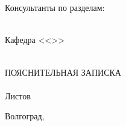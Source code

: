 {    \hfill
    \\\\
    Консультанты по разделам:\\
    \hfill
    \hfill
    \\
    \clearpage
    \renewcommand{\VSTUDocumentCodeSuffix}{81}
    \thispagestyle{empty}
    \begin{center}
    \VSTUTitleHeading
    Кафедра <<\VSTUDepartment>>\\
    \end{center}
    \vfill
    \hfill\VSTUTitleHeadApproval
    \vspace{8mm}
    \begin{center}
    \VSTUTitle\\
    \vspace{\fill}
    ПОЯСНИТЕЛЬНАЯ ЗАПИСКА\\
    \vspace{8mm}
    \VSTUDocumentCode\\
    \vspace{8mm}
    Листов \totalpages\\
    \vspace{\fill}
    \end{center}
    \begin{flushright}
    \VSTUTitleDirector
    \end{flushright}
    \vspace{8mm}
    \begin{flushleft}
    \VSTUTitleStandardsAdviser
    \hfill
    \VSTUTitleImplementer
    \end{flushleft}
    \vspace{\fill}
    \begin{center}
    Волгоград,~\the\year
    \end{center}
    \clearpage
}
